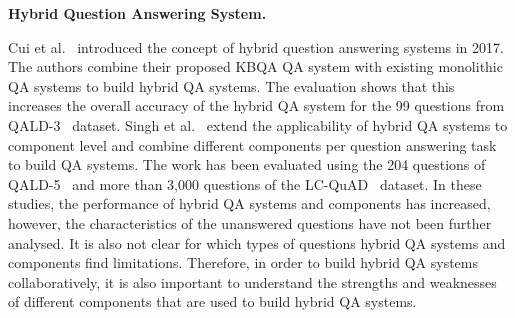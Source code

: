 \documentclass[sigconf,edbt]{acmart-edbt2019}
\newcommand{\ks}[1]{\todo[inline, color=yellow]{KS: #1}}
\begin{document}
{\bf Hybrid Question Answering System.} \begin{inparaenum}
Cui et al.~\cite{DBLP:journals/pvldb/CuiXWSHW17} introduced the concept of hybrid question answering systems in 2017. 
The authors combine their proposed KBQA QA system with existing monolithic QA systems to build hybrid QA systems. The evaluation shows that this increases the overall accuracy of the hybrid QA system for the 99 questions from QALD-3~\cite{cimiano2013multilingual} dataset. 
Singh et al.~\cite{DBLP:conf/www/SinghRBSLUVKP0V18} extend the applicability of hybrid QA systems to component level and combine different components per question answering task to build QA systems. The work has been evaluated using the 204 questions of QALD-5~\cite{DBLP:conf/clef/UngerFLNCCW15} and more than 3,000 questions of the LC-QuAD~\cite{trivedi2017lc} dataset. In these studies, the performance of hybrid QA systems and components has increased, however, the characteristics of the unanswered questions have not been further analysed. It is also not clear for which types of questions hybrid QA systems and components find limitations.
Therefore, in order to build hybrid QA systems collaboratively, it is also important to understand the strengths and weaknesses of different components that are used to build hybrid QA systems. 
\end{inparaenum}
\end{document}
